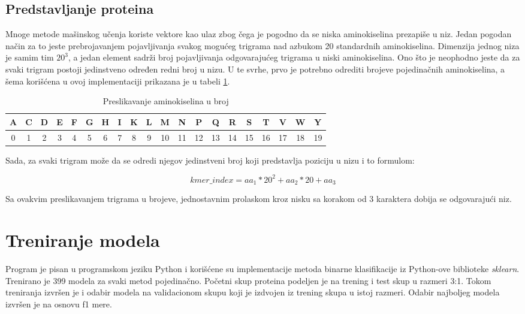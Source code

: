 \subsection{Predstavljanje proteina}
\label{subsec:proteins}

Mnoge metode mašinskog učenja koriste vektore kao ulaz zbog čega je pogodno da se niska aminokiselina prezapiše u niz. Jedan pogodan način za to jeste prebrojavanjem pojavljivanja svakog mogućeg trigrama nad azbukom 20 standardnih aminokiselina. Dimenzija jednog niza je samim tim $20^3$, a jedan element sadrži broj pojavljivanja odgovarajućeg trigrama u niski aminokiselina. Ono što je neophodno jeste da za svaki trigram postoji jedinstveno određen redni broj u nizu. U te svrhe, prvo je potrebno odrediti brojeve pojedinačnih aminokiselina, a šema korišćena u ovoj implementaciji prikazana je u tabeli \ref{tab: aminosNumbers}.


\begin{table}[H]
	\centering
	\begin{tabular}{|c|c|c|c|c|c|c|c|c|c|c|c|c|c|c|c|c|c|c|c|}
		\hline
		A & C & D & E & F & G & H & I & K & L & M & N & P & Q & R & S & T & V & W & Y \\
		\hline
		0 & 1 & 2 & 3 & 4 & 5 & 6 & 7 & 8 & 9 & 10 & 11 & 12 & 13 & 14 & 15 & 16 & 17 & 18 & 19 \\
		\hline             
	\end{tabular}
	\caption{Preslikavanje aminokiselina u broj}
	\label{tab: aminosNumbers}
\end{table}

Sada, za svaki trigram može da se odredi njegov jedinstveni broj koji predstavlja poziciju u nizu i to formulom:

$$kmer\_index = aa_1*20^2 + aa_2 * 20 + aa_3$$

Sa ovakvim preslikavanjem trigrama u brojeve, jednostavnim prolaskom kroz nisku sa korakom od 3 karaktera dobija se odgovarajući niz.


\section{Treniranje modela}
\label{sec:train}


Program je pisan u programskom jeziku Python i korišćene su implementacije metoda binarne klasifikacije iz Python-ove biblioteke \textit{sklearn}. Trenirano je 399 modela za svaki metod pojedinačno. Početni skup proteina podeljen je na trening i test skup u razmeri 3:1. Tokom treniranja izvršen je i odabir modela na validacionom skupu koji je izdvojen iz trening skupa u istoj razmeri. Odabir najboljeg modela izvršen je na osnovu f1 mere.


